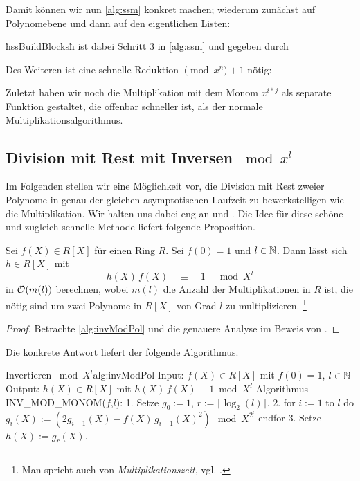 Damit können wir nun \autoref{alg:ssm} konkret machen; wiederum zunächst auf
Polynomebene und dann auf den eigentlichen Listen:

ħssBuildBlocksħ ist dabei Schritt 3 in \autoref{alg:ssm} und gegeben durch

Des Weiteren ist eine schnelle Reduktion $\pmod x^n+1$ nötig:

Zuletzt haben wir noch die Multiplikation mit dem Monom $x^{i*j}$ als separate
Funktion gestaltet, die offenbar schneller ist, als der normale
Multiplikationsalgorithmus.

\subsection{Division mit Rest mit Inversen $\bmod x^l$}
Im Folgenden stellen wir eine Möglichkeit vor, die Division mit Rest zweier
Polynome in genau der gleichen asymptotischen Laufzeit zu bewerkstelligen wie
die Multiplikation. Wir halten uns dabei eng an 
\cite{divHensel} und \cite{divHensel2}.
Die Idee für diese schöne und zugleich schnelle Methode liefert folgende 
Proposition.

\begin{prop}
  Sei $f(X) \in R[X]$ für einen Ring $R$. Sei $f(0) = 1$ und 
  $l \in \mathbb{N}$. Dann lässt sich $h \in R[X]$ mit
  \[ h(X)\, f(X) \quad\equiv\quad 1 \quad \bmod X^l\]
  in $\mathcal{O}(m(l))$ berechnen,
  wobei $m(l)$ die Anzahl der Multiplikationen in $R$ ist, die nötig sind 
  um zwei Polynome in $R[X]$ von Grad $l$ zu multiplizieren.%
  \footnote{Man spricht auch von \emph{Multiplikationszeit}, 
  vgl. \autocite[Definition 2]{divHensel}.}
\end{prop}
\begin{proof}
  Betrachte \autoref{alg:invModPol} und die genauere Analyse im Beweis von
  \autocite[Theorem 2]{divHensel}.
\end{proof}

Die konkrete Antwort liefert der folgende Algorithmus.

\begin{pseudocode}{Invertieren $\bmod X^l$}{alg:invModPol}
Input: $f(X) \in R[X]$ mit $f(0)=1$, $l\in \mathbb{N}$
Output: $h(X) \in R[X]$ mit $h(X)\,f(X) \equiv 1 \bmod X^l$
Algorithmus INV_MOD_MONOM($f$,$l$):
  1. Setze $g_0 := 1$, $r := \lceil \log_2(l)\rceil$.
  2. for $i:=1$ to $l$ do
        $g_i(X) := (2 g_{i-1}(X) - f(X)\,g_{i-1}(X)^2)\ \bmod X^{2^i}$
     endfor
  3. Setze $h(X) := g_r(X)$.
\end{pseudocode}

